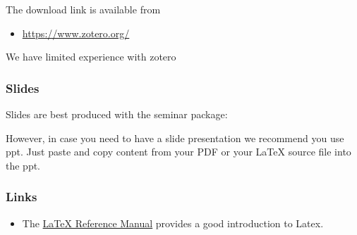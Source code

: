 The download link is available from
\begin{itemize}
\item {} 
\url{https://www.zotero.org/}

\end{itemize}

We have limited experience with zotero


\subsubsection{Slides}
\label{\detokenize{lesson/doc/latex:slides}}
Slides are best produced with the seminar package:

\begin{sphinxVerbatim}[commandchars=\\\{\}]
\PYGZbs{}

\PYGZbs{}

        

\PYGZbs{}

     

\PYGZbs{}

        

\PYGZbs{}
\end{sphinxVerbatim}

However, in case you need to have a slide presentation we recommend
you use ppt. Just paste and copy content from your PDF or your LaTeX
source file into the ppt.


\subsubsection{Links}
\label{\detokenize{lesson/doc/latex:id3}}\label{\detokenize{lesson/doc/latex:links}}\begin{itemize}
\item {} 
The \href{http://texdoc.net/texmf-dist/doc/latex/latex2e-help-texinfo/latex2e.pdf}{LaTeX Reference
Manual}
provides a good introduction to Latex.

\end{itemize}


